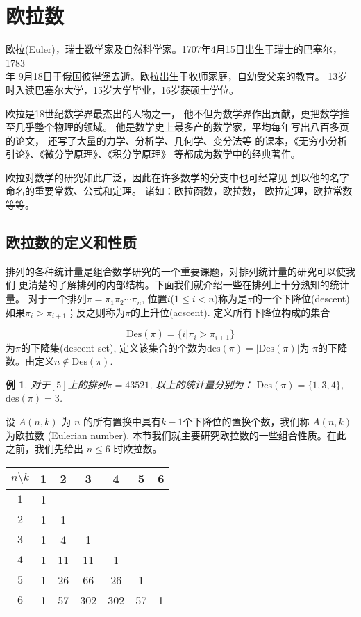 \documentclass[a4paper,11pt]{article}
\newtheorem{exa}[thm]{例}
\def \des{\mathrm{des}}
\def \Des{\mathrm{Des}}
\begin{document}
\section{欧拉数}

欧拉(Euler)，瑞士数学家及自然科学家。1707年4月15日出生于瑞士的巴塞尔，1783\\年
9月18日于俄国彼得堡去逝。欧拉出生于牧师家庭，自幼受父亲的教育。
13岁时入读巴塞尔大学，15岁大学毕业，16岁获硕士学位。

欧拉是18世纪数学界最杰出的人物之一，
他不但为数学界作出贡献，更把数学推至几乎整个物理的领域。
他是数学史上最多产的数学家，平均每年写出八百多页的论文，
还写了大量的力学、分析学、几何学、变分法等
的课本，《无穷小分析引论》、《微分学原理》、《积分学原理》
等都成为数学中的经典著作。

欧拉对数学的研究如此广泛，因此在许多数学的分支中也可经常见
到以他的名字
命名的重要常数、公式和定理。 诸如：欧拉函数，欧拉数，
欧拉定理，欧拉常数等等。




\subsection{欧拉数的定义和性质}
排列的各种统计量是组合数学研究的一个重要课题，对排列统计量的研究可以使我们
更清楚的了解排列的内部结构。下面我们就介绍一些在排列上十分熟知的统计量。
对于一个排列$\pi=\pi_1\pi_2\cdots \pi_n$, 
位置$i$($1\leqslant i<n$)称为是$\pi$的一个{下降位}(descent)
如果$\pi_i>\pi_{i+1}$；反之则称为$\pi$的{上升位}(acscent).
定义所有下降位构成的集合

$$\Des(\pi)=\{i|\pi_i>\pi_{i+1}\}$$
为$\pi$的下降集(descent set),
定义该集合的个数为$\des(\pi)=|\Des(\pi)|$为
$\pi$的下降数。由定义$n\notin \Des(\pi)$.


\begin{exa}
	对于$[5]$上的排列$\pi=43521$, 以上的统计量分别为：
	$\Des(\pi)=\{1,3,4\}$, $\des(\pi)=3$.
\end{exa}




设 $A(n,k)$ 为 $n$ 的所有置换中具有$k-1$个下降位的置换个数，我们称
$A(n,k)$ 为欧拉数 (Eulerian number).
本节我们就主要研究欧拉数的一些组合性质。在此之前，我们先给出 $n\leq
6$ 时欧拉数。

\begin{tabular}{c|c|c|c|c|c|c}
 $n \setminus k$    &1 &2 &3  &4  &5  &6\\
\hline $1$       &1  \\
\hline $2$       &1 &1 \\
\hline $3$       &1 &4 &1  \\
\hline $4$       &1 &11 &11  &1 \\
\hline $5$       &1 &26 &66  &26  &1 \\
\hline $6$       &1 &57 &302 &302 &57 &1
\end{tabular}
\end{document}
